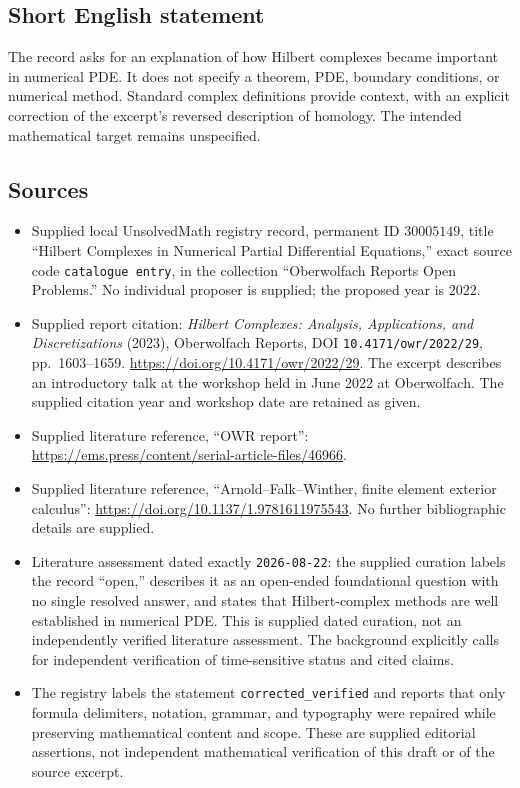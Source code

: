 \documentclass[11pt]{article}
\begin{document}
\subsection{Short English statement}
The record asks for an explanation of how Hilbert complexes became important in numerical PDE. It does not specify a theorem, PDE, boundary conditions, or numerical method. Standard complex definitions provide context, with an explicit correction of the excerpt's reversed description of homology. The intended mathematical target remains unspecified.
\subsection{Sources}
\begin{itemize}
\item Supplied local UnsolvedMath registry record, permanent ID \(30005149\), title ``Hilbert Complexes in Numerical Partial Differential Equations,'' exact source code \texttt{catalogue entry}, in the collection ``Oberwolfach Reports Open Problems.'' No individual proposer is supplied; the proposed year is \(2022\).
\item Supplied report citation: \emph{Hilbert Complexes: Analysis, Applications, and Discretizations} (2023), Oberwolfach Reports, DOI \texttt{10.4171/owr/2022/29}, pp.\ 1603--1659. \url{https://doi.org/10.4171/owr/2022/29}. The excerpt describes an introductory talk at the workshop held in June 2022 at Oberwolfach. The supplied citation year and workshop date are retained as given.
\item Supplied literature reference, ``OWR report'': \url{https://ems.press/content/serial-article-files/46966}.
\item Supplied literature reference, ``Arnold--Falk--Winther, finite element exterior calculus'': \url{https://doi.org/10.1137/1.9781611975543}. No further bibliographic details are supplied.
\item Literature assessment dated exactly \texttt{2026-08-22}: the supplied curation labels the record ``open,'' describes it as an open-ended foundational question with no single resolved answer, and states that Hilbert-complex methods are well established in numerical PDE. This is supplied dated curation, not an independently verified literature assessment. The background explicitly calls for independent verification of time-sensitive status and cited claims.
\item The registry labels the statement \texttt{corrected\_verified} and reports that only formula delimiters, notation, grammar, and typography were repaired while preserving mathematical content and scope. These are supplied editorial assertions, not independent mathematical verification of this draft or of the source excerpt.
\end{itemize}
\end{document}
